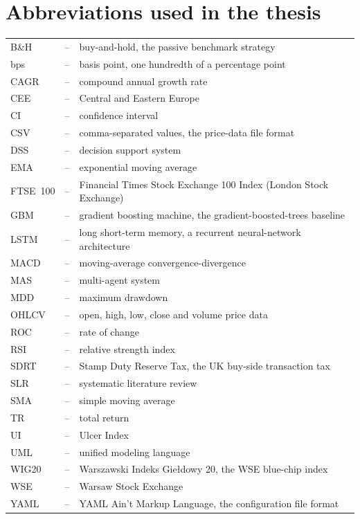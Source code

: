 \section*{Abbreviations used in the thesis}
\noindent
\begin{tabular}{l c l}
    B\&H   &--& buy-and-hold, the passive benchmark strategy \\
    bps    &--& basis point, one hundredth of a percentage point \\
    CAGR   &--& compound annual growth rate \\
    CEE    &--& Central and Eastern Europe \\
    CI     &--& confidence interval \\
    CSV    &--& comma-separated values, the price-data file format \\
    DSS    &--& decision support system \\
    EMA    &--& exponential moving average \\
    FTSE~100 &--& Financial Times Stock Exchange 100 Index (London Stock Exchange) \\
    GBM    &--& gradient boosting machine, the gradient-boosted-trees baseline \\
    LSTM   &--& long short-term memory, a recurrent neural-network architecture \\
    MACD   &--& moving-average convergence-divergence \\
    MAS    &--& multi-agent system \\
    MDD    &--& maximum drawdown \\
    OHLCV  &--& open, high, low, close and volume price data \\
    ROC    &--& rate of change \\
    RSI    &--& relative strength index \\
    SDRT   &--& Stamp Duty Reserve Tax, the UK buy-side transaction tax \\
    SLR    &--& systematic literature review \\
    SMA    &--& simple moving average \\
    TR     &--& total return \\
    UI     &--& Ulcer Index \\
    UML    &--& unified modeling language \\
    WIG20  &--& Warszawski Indeks Gie\l dowy 20, the WSE blue-chip index \\
    WSE    &--& Warsaw Stock Exchange \\
    YAML   &--& YAML Ain't Markup Language, the configuration file format \\
\end{tabular}
